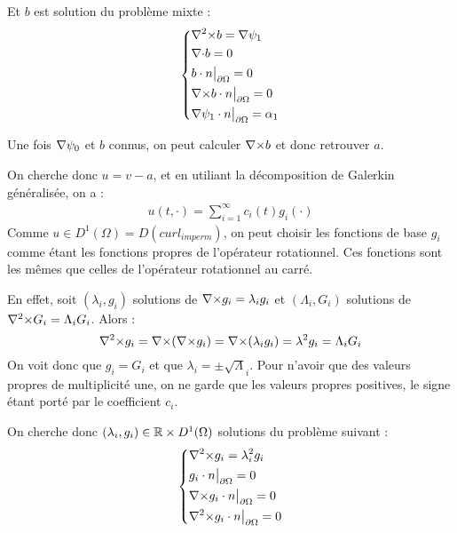Et $b$ est solution du problème mixte :
\begin{eqnarray}
\label{curlb}
\left\{
\begin{aligned}
&{\nabla^2\times} b = {\nabla}\psi_1\\
&{\nabla\cdot} b = 0\\
&b\cdot n{\big\rvert_{\partial\Omega}} = 0\\
&{\nabla\times} b\cdot n{\big\rvert_{\partial\Omega}} = 0\\
&{\nabla}\psi_1\cdot n{\big\rvert_{\partial\Omega}} = \alpha_1
\end{aligned}
\right.
\end{eqnarray}

Une fois ${\nabla}\psi_0$ et $b$ connus, on peut calculer ${\nabla\times} b$ et donc
retrouver $a$.

On cherche donc $u=v-a$, et en utiliant la décomposition de Galerkin généralisée, on a :
\begin{eqnarray}
\label{u}
u(t,\cdot) = \sum_{i=1}^{\infty} c_i(t)g_i(\cdot)
\end{eqnarray}
Comme $u\in D^1(\Omega)=D(curl_{imperm})$, on peut choisir les fonctions de base
$g_i$ comme étant les fonctions propres de l'opérateur rotationnel. Ces
fonctions sont les mêmes que celles de l'opérateur rotationnel au
carré.

En effet, soit $(\lambda_i,g_i)$ solutions de ${\nabla\times} g_i = \lambda_ig_i$ et $(\Lambda_i,G_i)$ solutions de ${\nabla^2\times} G_i = \Lambda_iG_i$. Alors :
\[
{\nabla^2\times} g_i = {\nabla\times}({\nabla\times} g_i)={\nabla\times}(\lambda_ig_i)=\lambda^2g_i = \Lambda_iG_i
\]
On voit donc que $g_i=G_i$ et que $\lambda_i=\pm\sqrt\Lambda_i$. Pour n'avoir que des valeurs propres de multiplicité une, on ne garde que les valeurs propres positives, le signe étant porté par le coefficient $c_i$.

On cherche donc $(\lambda_i,g_i)\in{\mathbb{R}}\times D^1(\Omega)$ solutions du problème suivant :
\begin{eqnarray}
\label{curlcurl}
\left\{
\begin{aligned}
&{\nabla^2\times}  g_i = \lambda_i^2 g_i\\
&g_i\cdot n{\big\rvert_{\partial\Omega}} = 0\\
&{\nabla\times} g_i\cdot n{\big\rvert_{\partial\Omega}} = 0\\
&{\nabla^2\times}  g_i\cdot n{\big\rvert_{\partial\Omega}} = 0
\end{aligned}
\right.
\end{eqnarray}

